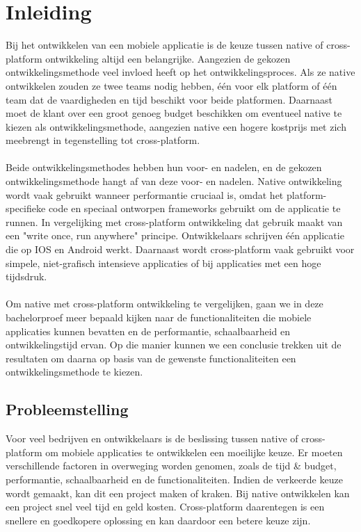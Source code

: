 
\chapter{Inleiding}
\label{ch:inleiding}

Bij het ontwikkelen van een mobiele applicatie is de keuze tussen native of cross-platform ontwikkeling altijd een belangrijke. 
Aangezien de gekozen ontwikkelingsmethode veel invloed heeft op het ontwikkelingsproces. 
Als ze native ontwikkelen zouden ze twee teams nodig hebben, één voor elk platform of één team dat de vaardigheden en tijd beschikt voor beide platformen. 
Daarnaast moet de klant over een groot genoeg budget beschikken om eventueel native te kiezen als ontwikkelingsmethode, 
aangezien native een hogere kostprijs met zich meebrengt in tegenstelling tot cross-platform.
\\\\
Beide ontwikkelingsmethodes hebben hun voor- en nadelen, en de gekozen ontwikkelingsmethode hangt af van deze voor- en nadelen. 
Native ontwikkeling wordt vaak gebruikt wanneer performantie cruciaal is, 
omdat het platform-specifieke code en speciaal ontworpen frameworks gebruikt om de applicatie te runnen. 
In vergelijking met cross-platform ontwikkeling dat gebruik maakt van een "write once, run anywhere" principe. 
Ontwikkelaars schrijven één applicatie die op IOS en Android werkt. 
Daarnaast wordt cross-platform vaak gebruikt voor simpele, niet-grafisch intensieve applicaties of bij applicaties met een hoge tijdsdruk.
\\\\
Om native met cross-platform ontwikkeling te vergelijken, gaan we in deze bachelorproef meer bepaald kijken naar de functionaliteiten 
die mobiele applicaties kunnen bevatten en de performantie, schaalbaarheid en ontwikkelingstijd ervan. 
Op die manier kunnen we een conclusie trekken uit de resultaten om daarna op basis van de gewenste functionaliteiten een ontwikkelingsmethode te kiezen.

\section{Probleemstelling}%
\label{sec:probleemstelling}

Voor veel bedrijven en ontwikkelaars is de beslissing tussen native of cross-platform om mobiele applicaties te ontwikkelen een moeilijke keuze. 
Er moeten verschillende factoren in overweging worden genomen, zoals de tijd \& budget, performantie, schaalbaarheid en de functionaliteiten. 
Indien de verkeerde keuze wordt gemaakt, kan dit een project maken of kraken. Bij native ontwikkelen kan een project snel veel tijd en geld kosten. 
Cross-platform daarentegen is een snellere en goedkopere oplossing en kan daardoor een betere keuze zijn.

